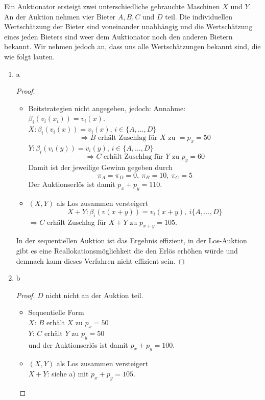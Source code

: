 \documentclass[12pt]{extreport} %
\theoremstyle{named}
\theoremstyle{nnamed}
\theoremstyle{itshape}
\theoremstyle{normal}
\begin{document}
Ein Auktionator ersteigt zwei unterschiedliche gebrauchte Maschinen $X$ und $Y$. An der Auktion nehmen vier Bieter $A, B, C$ und $D$ teil. Die individuellen Wertschätzung der Bieter sind voneinander unabhängig und die Wertschätzung eines jeden Bieters sind weer dem Auktionator noch den anderen Bietern bekannt. Wir nehmen jedoch an, dass uns alle Wertschätzungen bekannt sind, die wie folgt lauten.

\begin{enumerate}
	\item a
		\begin{proof} ~\
			\begin{itemize}
				\item Beitstrategien nicht angegeben, jedoch: Annahme: $\beta_i\left( v_i(x_i) \right) = v_i(x)$. ~\\
			
					$X \colon \beta_i\left( v_i(x) \right) = v_i(x)$, $i \in \{ A, \dotsc, D \}$
					$$ \Rightarrow B \text{ erhält Zuschlag für $X$ zu } = p_{x} = 50 $$
					$Y \colon \beta_i\left( v_i(y) \right) = v_i(y)$, $i \in \{ A, \dotsc, D \}$
					$$ \Rightarrow C \text{ erhält Zuschlag für $Y$ zu } p_{y} = 60 $$
					Damit ist der jeweilige Gewinn gegeben durch
					$$\pi_A = \pi_D = 0, ~ \pi_B = 10, ~\pi_C = 5 $$
					Der Auktionserlös ist damit $p_x + p_y = 110$.
				\item $(X, Y)$ als Los zusammen versteigert
					$$ X + Y \colon \beta_i \left( v(x+y) \right) = v_i(x+y), ~ i \{ A, \dotsc, D \} $$
					$\Rightarrow C$ erhält Zuschlag für $X+Y$ zu $p_{x+y} = 105$.
			\end{itemize}
			In der sequentiellen Auktion ist das Ergebnis effizient, in der Los-Auktion gibt es eine Reallokationsmöglichkeit die den Erlös erhöhen würde und demnach kann dieses Verfahren nicht effizient sein.
		\end{proof}
	\item b
		\begin{proof}
			$D$ nicht nicht an der Auktion teil.
			\begin{itemize}
				\item Sequentielle Form ~\\
					 $X$: $B$ erhält $X$ zu $p_{x} = 50$ \\
					  $Y$: $C$ erhält $Y$ zu $p_{y} = 50$ \\
					  
					  und der Auktionserlös ist damit $p_x + p_y = 100$.
				\item  $(X, Y)$ als Los zusammen versteigert ~\\
					$X + Y$: siehe a) mit $p_x + p_y = 105$.
			\end{itemize}
		\end{proof}
\end{enumerate}
\end{document}
